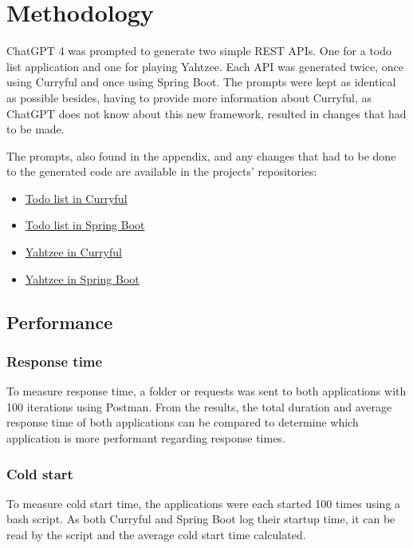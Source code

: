 \documentclass[a4paper]{article}
\begin{document}
\section{Methodology}


ChatGPT 4 was prompted to generate two simple REST APIs. One for a todo list
application and one for playing Yahtzee. Each API was generated twice, once
using Curryful and once using Spring Boot. The prompts were kept as identical as
possible besides, having to provide more information about Curryful, as ChatGPT
does not know about this new framework, resulted in changes that had to be made.

The prompts, also found in the appendix, and any changes that had to
be done to the generated code are available in the projects' repositories:
\begin{itemize}
	\item \hyperlink{https://github.com/lerchl/curryful-bachelor-thesis-curryful-todo-list}{Todo list in Curryful}
	\item \hyperlink{https://github.com/lerchl/curryful-bachelor-thesis-spring-boot-todo-list}{Todo list in Spring Boot}
	\item \hyperlink{https://github.com/lerchl/curryful-bachelor-thesis-curryful-yahtzee}{Yahtzee in Curryful}
	\item \hyperlink{https://github.com/lerchl/curryful-bachelor-thesis-spring-boot-yahtzee}{Yahtzee in Spring Boot}
\end{itemize}

\subsection{Performance}
\subsubsection{Response time}
To measure response time, a folder or requests was sent to both applications
with 100 iterations using Postman. From the results, the total duration and
average response time of both applications can be compared to determine which
application is more performant regarding response times.

\subsubsection{Cold start}
To measure cold start time, the applications were each started 100 times using
a bash script. As both Curryful and Spring Boot log their startup time, it can
be read by the script and the average cold start time calculated.
\end{document}

